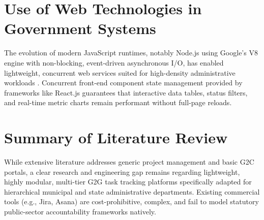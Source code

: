 \section{Use of Web Technologies in Government Systems}
\label{sec:web_tech_gov}
The evolution of modern JavaScript runtimes, notably Node.js using Google's V8 engine with non-blocking, event-driven asynchronous I/O, has enabled lightweight, concurrent web services suited for high-density administrative workloads \cite{tilkov2010node}. Concurrent front-end component state management provided by frameworks like React.js guarantees that interactive data tables, status filters, and real-time metric charts remain performant without full-page reloads.

\section{Summary of Literature Review}
\label{sec:lit_summary}
While extensive literature addresses generic project management and basic G2C portals, a clear research and engineering gap remains regarding lightweight, highly modular, multi-tier G2G task tracking platforms specifically adapted for hierarchical municipal and state administrative departments. Existing commercial tools (e.g., Jira, Asana) are cost-prohibitive, complex, and fail to model statutory public-sector accountability frameworks natively.
